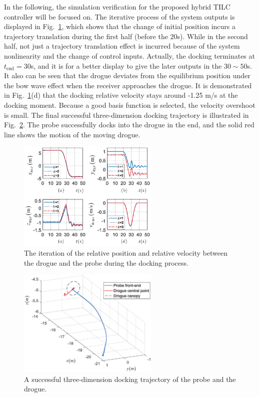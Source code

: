 In the following, the simulation verification for the proposed hybrid TILC
controller will be focused on. The iterative process of the system outputs is
displayed in Fig.~\ref{Fig_DockingPosition}, which shows that the change of
initial position incurs a trajectory translation during the first half (before
the $20$s). While in the second half, not just a trajectory translation effect
is incurred because of the system nonlinearity and the change of control
inputs. Actually, the docking terminates at $t_{\text{end}}=30$s, and it is
for a better display to give the later outputs in the $30\sim50$s. It also can
be seen that the drogue deviates from the equilibrium position under the bow
wave effect when the receiver approaches the drogue. It is demonstrated in
Fig.~\ref{Fig_DockingPosition}(d) that the docking relative velocity stays
around -1.25 m/s at the docking moment. Because a good basis function is
selected, the velocity overshoot is small. The final successful
three-dimension docking trajectory is illustrated in Fig.~\ref{Fig_Docking3D}.
The probe successfully docks into the drogue in the end, and the solid red
line shows the motion of the moving drogue. \begin{figure}[pth]
	\begin{centering}
		\includegraphics[width=0.6\textwidth]{Figures/Figs_Ch10/Out_C3} 
		\par \end{centering}
	\caption{The iteration of the relative position and relative velocity between the drogue and the probe during the docking process.}%
	\label{Fig_DockingPosition}%
\end{figure}\begin{figure}[pth]
	\begin{centering}
		\includegraphics[width=0.6\textwidth]{Figures/Figs_Ch10/3DPath_C3} 
		\par \end{centering}
	\caption{A successful three-dimension docking trajectory of the probe and the drogue.}%
	\label{Fig_Docking3D}%
\end{figure}

